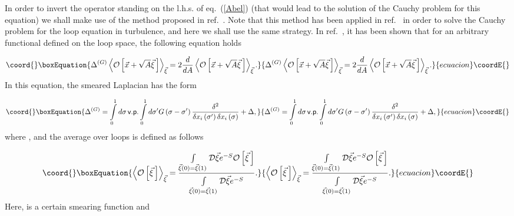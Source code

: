 \documentclass[a4paper,12pt]{article}
\begin{document}
In order to invert the operator standing on the l.h.s. of eq.~(\ref{Abel}) (that would lead to
the solution of the Cauchy problem for this equation) we
shall make use of the method proposed
in ref.~\cite{lapl}. Note that this method has been applied in ref.~\cite{tur2} in order to solve the Cauchy problem for the
loop equation in turbulence, and here we shall use the same strategy.
In ref.~\cite{lapl}, it has been shown that for an arbitrary functional \coordHE{}
defined on the loop space, the following equation holds

\begin{equation}\coord{}\boxEquation{
\label{4}
\Delta^{(G)}\left<{\cal O}\left[\vec x+\sqrt{A}\vec\xi{\,}\right]\right>_{\vec\xi}=
2\frac{d}{dA}\left<{\cal O}\left[\vec x+\sqrt{A}\vec\xi{\,}\right]\right>_{\vec\xi}.
}{
\Delta^{(G)}\left<{\cal O}\left[\vec x+\sqrt{A}\vec\xi{\,}\right]\right>_{\vec\xi}=
2\frac{d}{dA}\left<{\cal O}\left[\vec x+\sqrt{A}\vec\xi{\,}\right]\right>_{\vec\xi}.
}{ecuacion}\coordE{}\end{equation}
In this equation, the smeared Laplacian \coordHE{} has the form

\begin{equation}\coord{}\boxEquation{
\label{5}
\Delta^{(G)}=\int\limits_0^1 d\sigma{\,} \textsf{v.p.}\int\limits_0^1 d\sigma^\prime
G\left(\sigma-\sigma^\prime\right)\frac{\delta^2}{\delta x_i\left(
\sigma^\prime\right)
\delta x_i\left(\sigma\right)}+\Delta,
}{
\Delta^{(G)}=\int\limits_0^1 d\sigma{\,} \textsf{v.p.}\int\limits_0^1 d\sigma^\prime
G\left(\sigma-\sigma^\prime\right)\frac{\delta^2}{\delta x_i\left(
\sigma^\prime\right)
\delta x_i\left(\sigma\right)}+\Delta,
}{ecuacion}\coordE{}\end{equation}
where \coordHE{},
and the average over loops is defined as follows

\begin{equation}\coord{}\boxEquation{
\label{average}
\left<{\cal O}\left[\vec \xi{\,}\right]\right>_{\vec\xi}=
\frac{\int\limits_{\vec\xi(0)=
\vec\xi(1)}^{}{\cal D}\vec\xi e^{-S}{\cal O}\left[\vec\xi{\,}\right]}
{\int\limits_{\vec
\xi(0)=\vec\xi(1)}^{}{\cal D}\vec\xi e^{-S}}.
}{
\left<{\cal O}\left[\vec \xi{\,}\right]\right>_{\vec\xi}=
\frac{\int\limits_{\vec\xi(0)=
\vec\xi(1)}^{}{\cal D}\vec\xi e^{-S}{\cal O}\left[\vec\xi{\,}\right]}
{\int\limits_{\vec
\xi(0)=\vec\xi(1)}^{}{\cal D}\vec\xi e^{-S}}.
}{ecuacion}\coordE{}\end{equation}
Here, \coordHE{} is a certain smearing function and
\end{document}
